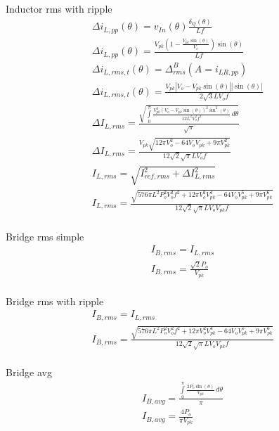\documentclass[12pt]{report}
\begin{document}
Inductor rms with ripple
\begin{align}
\Delta i_{L,pp}(\theta) = v_{In}(\theta)\frac{\delta_{Q}(\theta)}{Lf}\\
\Delta i_{L,pp}(\theta) = \frac{V_{pk} \left(1 - \frac{V_{pk} \sin{\left(\theta \right)}}{V_{o}}\right) \sin{\left(\theta \right)}}{L f}\\
\Delta i_{L,rms,t}(\theta) = \Delta^B_{rms}(A=i_{LR,pp})\\
\Delta i_{L,rms,t}(\theta) = \frac{V_{pk} \left|{V_{o} - V_{pk} \sin{\left(\theta \right)}}\right| \left|{\sin{\left(\theta \right)}}\right|}{2 \sqrt{3} L V_{o} f}\\
\Delta I_{L,rms} = \frac{\sqrt{\int\limits_{0}^{\pi} \frac{V_{pk}^{2} \left(V_{o} - V_{pk} \sin{\left(\theta \right)}\right)^{2} \sin^{2}{\left(\theta \right)}}{12 L^{2} V_{o}^{2} f^{2}}\, d\theta}}{\sqrt{\pi}}\\
\Delta I_{L,rms} = \frac{V_{pk} \sqrt{12 \pi V_{o}^{2} - 64 V_{o} V_{pk} + 9 \pi V_{pk}^{2}}}{12 \sqrt{2} \sqrt{\pi} L V_{o} f}\\
I_{L,rms} = \sqrt{I_{ref,rms}^2 + \Delta I_{L,rms}^2}\\
I_{L,rms} = \frac{\sqrt{576 \pi L^{2} P_{o}^{2} V_{o}^{2} f^{2} + 12 \pi V_{o}^{2} V_{pk}^{4} - 64 V_{o} V_{pk}^{5} + 9 \pi V_{pk}^{6}}}{12 \sqrt{2} \sqrt{\pi} L V_{o} V_{pk} f}\\
\end{align}

Bridge rms simple
\begin{align}
I_{B,rms} = I_{L,rms}\\
I_{B,rms} = \frac{\sqrt{2} P_{o}}{V_{pk}}\\
\end{align}

Bridge rms with ripple
\begin{align}
I_{B,rms} = I_{L,rms}\\
I_{B,rms} = \frac{\sqrt{576 \pi L^{2} P_{o}^{2} V_{o}^{2} f^{2} + 12 \pi V_{o}^{2} V_{pk}^{4} - 64 V_{o} V_{pk}^{5} + 9 \pi V_{pk}^{6}}}{12 \sqrt{2} \sqrt{\pi} L V_{o} V_{pk} f}\\
\end{align}

Bridge avg
\begin{align}
I_{B,avg} = \frac{\int\limits_{0}^{\pi} \frac{2 P_{o} \sin{\left(\theta \right)}}{V_{pk}}\, d\theta}{\pi}\\
I_{B,avg} = \frac{4 P_{o}}{\pi V_{pk}}\\
\end{align}
\end{document}
